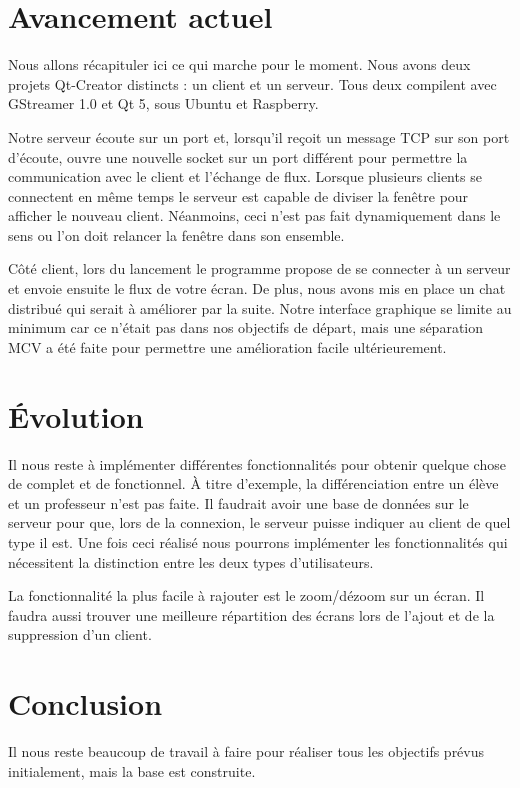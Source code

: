 \documentclass[a4paper, 11pt]{article}
\begin{document}
\section{Avancement actuel}

Nous allons récapituler ici ce qui marche pour le moment. Nous avons deux projets Qt-Creator distincts : un client et un serveur. Tous deux compilent avec GStreamer 1.0 et Qt 5, sous Ubuntu et Raspberry. 

Notre serveur écoute sur un port et, lorsqu'il reçoit un message TCP sur son port d'écoute, ouvre une nouvelle socket sur un port différent pour permettre la communication avec le client et l'échange de flux. Lorsque plusieurs clients se connectent en même temps le serveur est capable de diviser la fenêtre pour afficher le nouveau client. Néanmoins, ceci n'est pas fait dynamiquement dans le sens ou l'on doit relancer la fenêtre dans son ensemble. 

Côté client, lors du lancement le programme propose de se connecter à un serveur et envoie ensuite le flux de votre écran. De plus, nous avons mis en place un chat distribué qui serait à améliorer par la suite. Notre interface graphique se limite au minimum car ce n'était pas dans nos objectifs de départ, mais une séparation MCV a été faite pour permettre une amélioration facile ultérieurement.

\section{Évolution}

Il nous reste à implémenter différentes fonctionnalités pour obtenir quelque chose de complet et de fonctionnel. À titre d'exemple, la différenciation entre un élève et un professeur n'est pas faite. Il faudrait avoir une base de données sur le serveur pour que, lors de la connexion, le serveur puisse indiquer au client de quel type il est. Une fois ceci réalisé nous pourrons implémenter les fonctionnalités qui nécessitent la distinction entre les deux types d'utilisateurs.

La fonctionnalité la plus facile à rajouter est le zoom/dézoom sur un écran. Il faudra aussi trouver une meilleure répartition des écrans lors de l'ajout et de la suppression d'un client.

\section{Conclusion}

Il nous reste beaucoup de travail à faire pour réaliser tous les objectifs prévus initialement, mais la base est construite.

\clearpage
\end{document}
